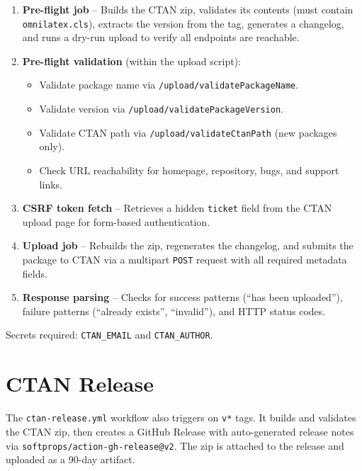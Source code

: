 \begin{enumerate}
  \item \textbf{Pre-flight job} -- Builds the CTAN zip, validates its
        contents (must contain \texttt{omnilatex.cls}), extracts the version
        from the tag, generates a changelog, and runs a dry-run upload to
        verify all endpoints are reachable.

  \item \textbf{Pre-flight validation} (within the upload script):
    \begin{itemize}
      \item Validate package name via
            \texttt{/upload/validatePackageName}.
      \item Validate version via
            \texttt{/upload/validatePackageVersion}.
      \item Validate CTAN path via
            \texttt{/upload/validateCtanPath} (new packages only).
      \item Check URL reachability for homepage, repository, bugs, and
            support links.
    \end{itemize}

  \item \textbf{CSRF token fetch} -- Retrieves a hidden \texttt{ticket}
        field from the CTAN upload page for form-based authentication.

  \item \textbf{Upload job} -- Rebuilds the zip, regenerates the
        changelog, and submits the package to CTAN via a multipart
        \texttt{POST} request with all required metadata fields.

  \item \textbf{Response parsing} -- Checks for success patterns
        (``has been uploaded''), failure patterns (``already exists'',
        ``invalid''), and HTTP status codes.
\end{enumerate}

Secrets required: \texttt{CTAN\_EMAIL} and \texttt{CTAN\_AUTHOR}.

\section{CTAN Release}

The \texttt{ctan-release.yml} workflow also triggers on \texttt{v*} tags.
It builds and validates the CTAN zip, then creates a GitHub Release with
auto-generated release notes via \texttt{softprops/action-gh-release@v2}.
The zip is attached to the release and uploaded as a 90-day artifact.

